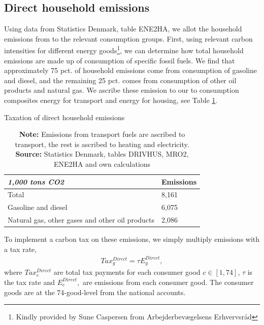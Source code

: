 \subsection{Direct household emissions}
Using data from Statistics Denmark, table ENE2HA, we allot the household emissions from to the relevant consumption groups. First, using relevant carbon intensities for different energy goods\footnote{Kindly provided by Sune Caspersen from Arbejderbevægelsens Erhvervsråd}, we can determine how total household emissions are made up of consumption of specific fossil fuels. We find that approximately 75 pct. of household emissions come from consumption of gasoline and diesel, and the remaining 25 pct. comes from consumption of other oil products and natural gas. We ascribe these emission to our to consumption composites energy for transport and energy for housing, see Table \ref{tabdirectemissions}.

\begin{table}[H]
\centering
\caption{Taxation of direct household emissions}
\begin{tabular}{ll}
\textit{1,000 tons CO2}  & Emissions \\ \hline
Total             & 8,161 \\ \hline
Gasoline and diesel   & 6,075  \\ 
Natural gas, other gases and other oil products & 2,086   \\ \hline
\end{tabular}
\label{tabdirectemissions}
\setlength{\captionmargin}{10pt}
\caption*{
\textbf{Note:} Emissions from transport fuels are ascribed to transport, the rest is ascribed to heating and electricity. \\ \textbf{Source:} Statistics Denmark, tables DRIVHUS, MRO2, ENE2HA and own calculations}
\end{table}
To implement a carbon tax on these emissions, we simply multiply emissions with a tax rate,
\begin{align}
    Tax^{Direct}_g = \tau E^{Direct}_g,
\end{align}
where $Tax^{Direct}_c$ are total tax payments for each consumer good $c \in [1,74]$, $\tau$ is the tax rate and $E^{Direct}_c,$ are emissions from each consumer good. The consumer goods are at the 74-good-level from the national accounts.


